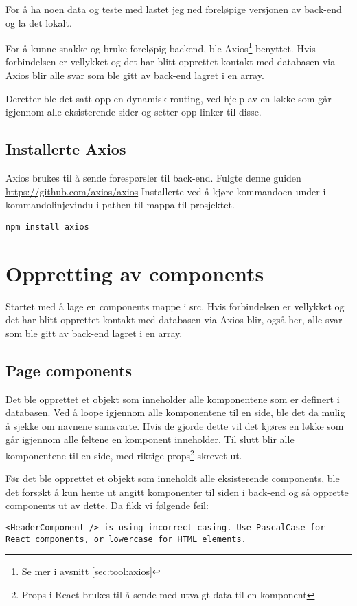 For å ha noen data og teste med lastet jeg ned foreløpige versjonen av back-end og la det lokalt.

For å kunne snakke og bruke foreløpig backend, ble Axios\footnote{Se mer i avsnitt \ref{sec:tool:axios}} benyttet. Hvis forbindelsen er vellykket og det har blitt opprettet kontakt med databasen via Axios blir alle svar som ble gitt av back-end lagret i en array. 

Deretter ble det satt opp en dynamisk routing, ved hjelp av en løkke som går igjennom alle eksisterende sider og setter opp linker til disse.

\subsection{Installerte Axios}
Axios brukes til å sende forespørsler til back-end.
Fulgte denne guiden
\url{https://github.com/axios/axios}
Installerte ved å kjøre kommandoen under i kommandolinjevindu i pathen til mappa til prosjektet.
\begin{lstlisting}
npm install axios
\end{lstlisting}


\section{Oppretting av components}
Startet med å lage en components mappe i src. Hvis forbindelsen er vellykket og det har blitt opprettet kontakt med databasen via Axios blir, også her, alle svar som ble gitt av back-end lagret i en array. 

\subsection{Page components}

Det ble opprettet et objekt som inneholder alle komponentene som er definert i databasen. Ved å loope igjennom alle komponentene til en side, ble det da mulig å sjekke om navnene samsvarte. Hvis de gjorde dette vil det kjøres en løkke som går igjennom alle feltene en komponent inneholder. Til slutt blir alle komponentene til en side, med riktige props\footnote{Props i React brukes til å sende med utvalgt data til en komponent} skrevet ut.  

Før det ble opprettet et objekt som inneholdt alle eksisterende components, ble det forsøkt å kun hente ut angitt komponenter til siden i back-end og så opprette components ut av dette. Da fikk vi følgende feil:
\begin{lstlisting}
<HeaderComponent /> is using incorrect casing. Use PascalCase for React components, or lowercase for HTML elements.
\end{lstlisting}

